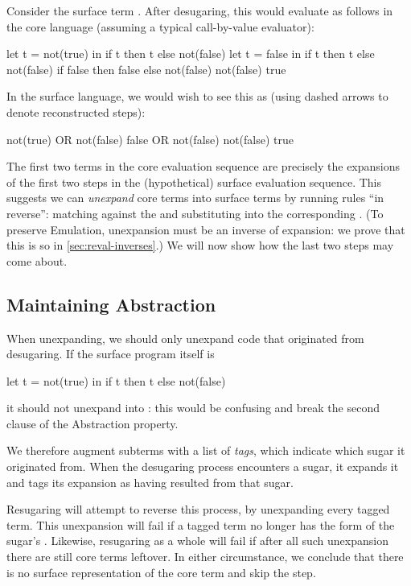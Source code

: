 Consider the surface term . After
desugaring, this would evaluate as follows in the core language
(assuming a typical call-by-value evaluator):
\begin{Codes}
    let t = not(true) in
      if t then t else not(false)
\CoreStep let t = false in
      if t then t else not(false)
\CoreStep if false then false else not(false)
\CoreStep not(false)
\CoreStep true
\end{Codes}
In the surface language, we would wish to see this as (using dashed
arrows to denote reconstructed steps):
\begin{Codes}
    not(true) OR not(false)
\SurfStep false OR not(false)
\SurfStep not(false)
\SurfStep true
\end{Codes}
The first two terms in the core evaluation sequence are precisely the
expansions of the first two steps in the (hypothetical) surface evaluation
sequence. This suggests
we can \emph{unexpand} core terms into surface terms by running rules ``in
reverse'': matching against the  and substituting into the
corresponding .
(To preserve Emulation, unexpansion must be an inverse of expansion: we
prove that this is so in \cref{sec:reval-inverses}.)
We will now show how the last two steps
may come about.

\subsection{Maintaining Abstraction}
\label{sec:reval-exposition-tagging}

When unexpanding, we should only unexpand code that
originated from desugaring. If the surface program itself is
\begin{Codes}
let t = not(true) in
  if t then t else not(false)
\end{Codes}
it should not unexpand into :
this would be confusing and break the second clause of the Abstraction property.

We therefore augment subterms with a list of \emph{tags}, which
indicate which sugar it originated from.
When the desugaring process encounters a sugar, it expands it and
tags its expansion as having resulted from that sugar.

Resugaring will attempt to reverse this process, by unexpanding every
tagged term. This unexpansion will fail if a tagged term no longer has
the form of the sugar's . Likewise, resugaring as a whole will
fail if after all such unexpansion there are still core terms
leftover. In either circumstance, we conclude that there is no
surface representation of the core term and skip the step.

